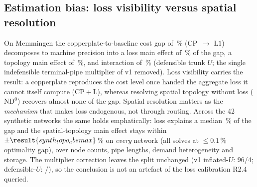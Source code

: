 \documentclass[a4paper,fleqn]{cas-dc}
\newcommand{\CP}{\ensuremath{\mathrm{CP}}}      %
\newcommand{\CPL}{\ensuremath{\mathrm{CP{+}L}}} %
\newcommand{\NDz}{\ensuremath{\mathrm{ND^{0}}}} %
\newcommand{\Lone}{\ensuremath{\mathrm{L1}}}    %
\begin{document}
\subsection{Estimation bias: loss visibility versus spatial resolution}
On Memmingen the copperplate-to-baseline cost gap of \,\%
(\CP\ $\to$ \Lone) decomposes to machine precision into a loss main effect of
\,\% of the gap, a topology main effect of \,\%,
and interaction of \,\% (defensible trunk $U$; the single
indefensible terminal-pipe multiplier of v1 removed). Loss visibility carries the
result: a copperplate reproduces the cost level once handed the aggregate loss it
cannot itself compute (\CPL), whereas resolving spatial topology without loss
(\NDz) recovers almost none of the gap. Spatial resolution matters as the
\emph{mechanism} that makes loss endogenous, not through routing. Across the 42
synthetic networks the same holds emphatically: loss explains a median
\,\% of the gap and the spatial-topology main effect stays
within $\pm\result{synth_topo_absmax}$\,\% on \emph{every} network (all solves at
$\le0.1$\,\% optimality gap), over node counts, pipe lengths, demand heterogeneity and
storage. The multiplier correction leaves the split unchanged (v1 inflated-$U$: 96/4;
defensible-$U$: /), so the conclusion is not an
artefact of the loss calibration R2.4 queried.

\end{document}
